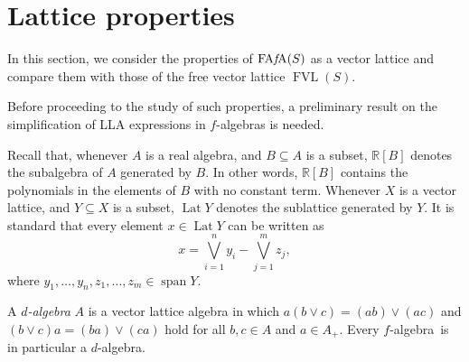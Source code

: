 \documentclass{memo-l}
\theoremstyle{definition}
\theoremstyle{remark}
\numberwithin{section}{chapter}
\numberwithin{equation}{chapter}
\newcommand\R{\ensuremath{\mathbb{R}}}
\newcommand{\falg}{$f\!$-algebra}
\newcommand{\FAFA}[1]{\operatorname{FA{\it f}\!A}(#1)}
\newcommand{\FVL}[1]{\operatorname{FVL}(#1)}
\DeclareMathOperator{\Lat}{Lat}
\DeclareMathOperator{\barespn}{span}
\begin{document}
\section{Lattice properties}\label{sec:lat_prop_FAFA}

In this section, we consider the properties of $\FAFA S$ as a vector
lattice and compare them with those of the free vector lattice $\FVL
S$.

Before proceeding to the study of such properties, a preliminary
result on the simplification of LLA expressions in \falg s is needed.

Recall that, whenever $A$ is a real algebra, and $B\subseteq A$ is a
subset, $\R[B]$ denotes the subalgebra of $A$ generated by $B$. In other words, $\R[B]$
contains the polynomials in the elements of $B$ with no constant term.
Whenever $X$ is a vector lattice, and $Y\subseteq X$ is a subset,
$\Lat Y$ denotes the sublattice generated by $Y$. It is standard
that every element $x \in \Lat Y$ can be written as
\[
x=\bigvee_{i=1} ^{n}y_i - \bigvee_{j=1} ^{m} z_j,
\]
where $y_1,\ldots ,y_n,z_1,\ldots ,z_m \in \barespn Y$.

A \emph{$d$-algebra} $A$ is a
vector lattice algebra in which $a(b\vee c)=(ab)\vee (ac)$ and $(b\vee
c)a=(ba)\vee (ca)$ hold for all $b,c \in A$ and $a \in A_+$. Every \falg\ is
in particular a $d$-algebra.
\end{document}
